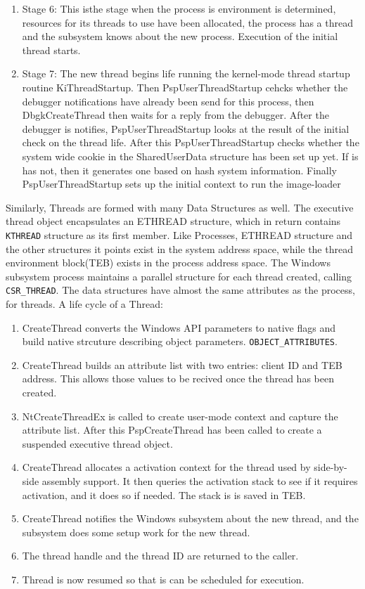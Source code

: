 \documentclass[letterpaper,10pt,draftclsnofoot,onecolumn]{IEEEtran}
\begin{document}
\begin{enumerate}
\item Stage 6: This isthe stage when the process is environment is determined, resources for its threads to use have been allocated, the process has a thread and the subsystem knows about the new process. Execution of the initial thread starts.
\item Stage 7: The new thread begins life running the kernel-mode thread startup routine KiThreadStartup. Then PspUserThreadStartup cehcks whether the debugger notifications have already been send for this process, then DbgkCreateThread then waits for a reply from the debugger. After the debugger is notifies, PspUserThreadStartup looks at the result of the initial check on the thread life. After this PspUserThreadStartup checks whether the system wide cookie in the SharedUserData structure has been set up yet. If is has not, then it generates one based on hash system information. Finally PspUserThreadStartup sets up the initial context to run the image-loader\cite{[1]}\\
\end{enumerate}
Similarly, Threads are formed with many Data Structures as well. The executive thread object encapsulates an ETHREAD structure, which in return contains \verb|KTHREAD| structure as its first member. Like Processes, ETHREAD structure and the other structures it points exist in the system address space, while the thread environment block(TEB) exists in the process address space. The Windows subsystem process maintains a parallel structure for each thread created, calling \verb|CSR_THREAD|. The data structures have almost the same attributes as the process, for threads.
A life cycle of a Thread:
\begin{enumerate}
\item CreateThread converts the Windows API parameters to native flags and build native strcuture describing object parameters. \verb|OBJECT_ATTRIBUTES|.
\item CreateThread builds an attribute list with two entries: client ID and TEB address. This allows those values to be recived once the thread has been created.
\item NtCreateThreadEx is called to create user-mode context and capture the attribute list. After this PspCreateThread has been called to create a suspended executive thread object.
\item CreateThread allocates a activation context for the thread used by side-by-side assembly support. It then queries the activation stack to see if it requires activation, and it does so if needed. The stack is is saved in TEB.
\item CreateThread notifies the Windows subsystem about the new thread, and the subsystem does some setup work for the new thread.
\item The thread handle and the thread ID are returned to the caller.
\item Thread is now resumed so that is can be scheduled for execution. \cite{[1]}
\end{enumerate}
\end{document}
